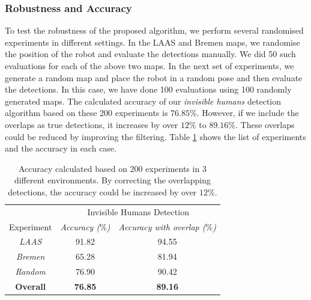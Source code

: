 \subsubsection{Robustness and Accuracy }
To test the robustness of the proposed algorithm, we perform several randomised experiments in different settings. In the LAAS and Bremen maps, we randomise the position of the robot and evaluate the detections manually. We did 50 such evaluations for each of the above two maps. In the next set of experiments, we generate a random map and place the robot in a random pose and then evaluate the detections. In this case, we have done 100 evaluations using 100 randomly generated maps. The calculated accuracy of our \textit{invisible humans} detection algorithm based on these 200 experiments is $76.85\%$. However, if we include the overlaps as true detections, it increases by over $12\%$ to $89.16\%$. These overlaps could be reduced by improving the filtering. Table \ref{acc} shows the list of experiments and the accuracy in each case.
\begin{table}[h!]
    \centering
    \begin{tabular}{|c|c|c|}
    \hline
    & \multicolumn{2}{c|}{Invisible Humans Detection}\\
    \cline{2-3}
    Experiment & \textit{Accuracy ($\%$)}& \textit{Accuracy with overlap ($\%$)} \\
    \hline
    \textit{LAAS} & 91.82 & 94.55\\
    \hline
    \textit{Bremen} & 65.28 & 81.94 \\
    \hline
    \textit{Random} & 76.90 & 90.42 \\
    \hline
     \textbf{Overall} & \textbf{76.85} & \textbf{89.16} \\
    \hline
    \end{tabular}
    \caption{Accuracy calculated based on 200 experiments in 3 different environments. By correcting the overlapping detections, the accuracy could be increased by over $12\%$.}
    \label{acc}
\end{table}

